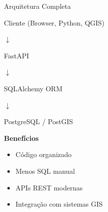 \documentclass{beamer}
\begin{document}
\begin{frame}{Arquitetura Completa}

\begin{center}

Cliente (Browser, Python, QGIS)

\vspace{0.2cm}

$\downarrow$

\vspace{0.2cm}

FastAPI

\vspace{0.2cm}

$\downarrow$

\vspace{0.2cm}

SQLAlchemy ORM

\vspace{0.2cm}

$\downarrow$

\vspace{0.2cm}

PostgreSQL / PostGIS

\end{center}

\vspace{0.5cm}

\textbf{Benefícios}

\begin{itemize}
    \item Código organizado
    \item Menos SQL manual
    \item APIs REST modernas
    \item Integração com sistemas GIS
\end{itemize}

\end{frame}
\end{document}
